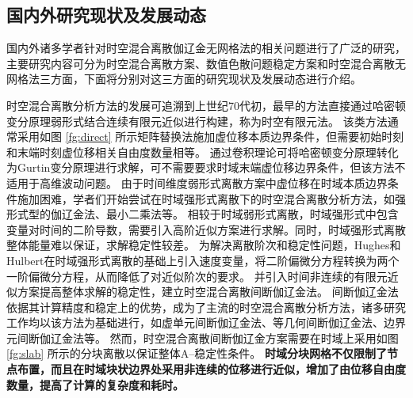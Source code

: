\subsection{国内外研究现状及发展动态}

国内外诸多学者针对时空混合离散伽辽金无网格法的相关问题进行了广泛的研究，主要研究内容可分为时空混合离散方案、数值色散问题稳定方案和时空混合离散无网格法三方面，下面将分别对这三方面的研究现状及发展动态进行介绍。

时空混合离散分析方法的发展可追溯到上世纪70代初\cite{argyris1969a}，最早的方法直接通过哈密顿变分原理弱形式结合连续有限元近似进行构建，称为时空有限元法。
该类方法通常采用如图 \ref{fg:direct} 所示矩阵替换法施加虚位移本质边界条件，但需要初始时刻和末端时刻虚位移相关自由度数量相等。
通过卷积理论可将哈密顿变分原理转化为Gurtin变分原理进行求解，可不需要要求时域末端虚位移边界条件\cite{Peng1992}，但该方法不适用于高维波动问题。
由于时间维度弱形式离散方案中虚位移在时域本质边界条件施加困难，学者们开始尝试在时域强形式离散下的时空混合离散分析方法，如强形式型的伽辽金法\cite{Li2017a}、最小二乘法\cite{epstein2024}等。
相较于时域弱形式离散，时域强形式中包含变量对时间的二阶导数，需要引入高阶近似方案进行求解。同时，时域强形式离散整体能量难以保证，求解稳定性较差。
为解决离散阶次和稳定性问题，Hughes和Hulbert\cite{hughes1988,hulbert1990}在时域强形式离散的基础上引入速度变量，将二阶偏微分方程转换为两个一阶偏微分方程，从而降低了对近似阶次的要求。
并引入时间非连续的有限元近似方案提高整体求解的稳定性，建立时空混合离散间断伽辽金法。
间断伽辽金法依据其计算精度和稳定上的优势，成为了主流的时空混合离散分析方法，诸多研究工作均以该方法为基础进行，如虚单元间断伽辽金法\cite{xu2025}、等几何间断伽辽金法\cite{lejeunes2024}、边界元间断伽辽金法\cite{hoonhout2023}等。
然而，时空混合离散间断伽辽金方案需要在时域上采用如图 \ref{fg:slab} 所示的分块离散以保证整体A--稳定性条件\cite{hughes1988}。
\textbf{时域分块网格不仅限制了节点布置，而且在时域块状边界处采用非连续的位移进行近似，增加了由位移自由度数量，提高了计算的复杂度和耗时。}

